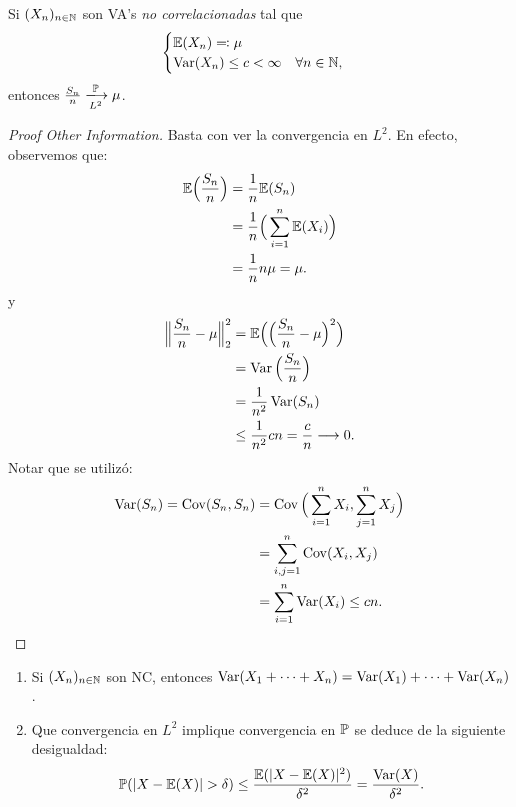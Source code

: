 \begin{theorem}
	Si $(X_{n})_{n \in \mathbb{N}}$ son VA's \textit{no correlacionadas} tal que
	\[ \begin{cases}
		\mathbb{E}(X_{n}) \eqcolon \mu \\
		\operatorname{Var}(X_{n}) \leq c < \infty \quad \forall n \in \mathbb{N},
	\end{cases} \]
	entonces $\frac{S_{n}}{n} \xlongrightarrow[L^{2}]{\mbb{P}} \mu$.
\end{theorem}
\begin{proof}[Proof Other Information]
	Basta con ver la convergencia en $L^{2}$. En efecto, observemos que:
	\begin{align*}
		\mathbb{E} \Big( \frac{S_{n}}{n} \Big) &= \frac{1}{n} \mathbb{E}(S_{n}) \\
		&= \frac{1}{n} \Big( \sum_{i=1}^{n} \mathbb{E}(X_{i}) \Big) \\
		&= \frac{1}{n} n \mu = \mu
	.\end{align*}
	y
	\begin{align*}
		\Big{\|} \frac{S_{n}}{n} - \mu \Big{\|}_{2}^{2} &= \mathbb{E} \Big( \Big( \frac{S_{n}}{n} - \mu \Big)^{2} \Big) \\
		&= \operatorname{Var} \Big( \frac{S_{n}}{n} \Big) \\
		&= \frac{1}{n^{2}} \operatorname{Var}(S_{n}) \\
		&\leq \frac{1}{n^{2}} cn = \frac{c}{n} \longrightarrow 0
	.\end{align*}
	Notar que se utilizó:
	\begin{align*}
		\operatorname{Var}(S_{n}) = \operatorname{Cov}(S_{n}, S_{n}) &= \operatorname{Cov} \Big( \sum_{i=1}^{n} X_{i}, \sum_{j=1}^{n} X_{j} \Big) \\
		&= \sum_{i,j=1}^{n} \operatorname{Cov}(X_{i},X_{j}) \\
		&= \sum_{i=1}^{n} \operatorname{Var}(X_{i}) \leq cn
	.\qedhere\end{align*}
\end{proof}

\begin{remark}
	\begin{enumerate}
		\item Si $(X_{n})_{n \in \mathbb{N}}$ son NC, entonces $\operatorname{Var}(X_{1} + \cdots + X_{n}) = \operatorname{Var}(X_{1}) + \cdots + \operatorname{Var}(X_{n})$.

		\item Que convergencia en $L^{2}$ implique convergencia en $\mathbb{P}$ se deduce de la siguiente desigualdad:
		\[ \mathbb{P}(|X - \mathbb{E}(X)| > \delta) \leq \frac{\mathbb{E}(|X - \mathbb{E}(X)|^{2})}{\delta^{2}} = \frac{\operatorname{Var}(X)}{\delta^{2}}. \]
	\end{enumerate}
\end{remark}


